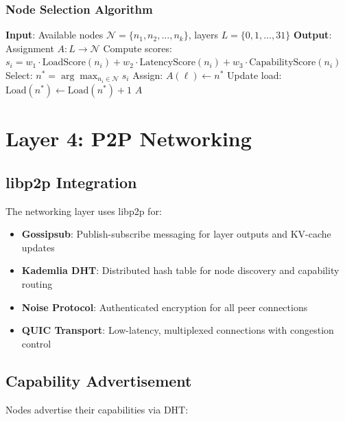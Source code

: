 \documentclass[11pt,a4paper]{article}
\begin{document}
\subsubsection{Node Selection Algorithm}

\begin{algorithm}[H]
\caption{Dynamic Layer Assignment with Load Balancing}
\begin{algorithmic}[1]
\STATE \textbf{Input}: Available nodes $\mathcal{N} = \{n_1, n_2, \ldots, n_k\}$, layers $L = \{0, 1, \ldots, 31\}$
\STATE \textbf{Output}: Assignment $A: L \rightarrow \mathcal{N}$
    \STATE Compute scores: $s_i = w_1 \cdot \text{LoadScore}(n_i) + w_2 \cdot \text{LatencyScore}(n_i) + w_3 \cdot \text{CapabilityScore}(n_i)$
    \STATE Select: $n^* = \arg\max_{n_i \in \mathcal{N}} s_i$
    \STATE Assign: $A(\ell) \gets n^*$
    \STATE Update load: $\text{Load}(n^*) \gets \text{Load}(n^*) + 1$
\ENDFOR
\RETURN $A$
\end{algorithmic}
\end{algorithm}

\newpage
\section{Layer 4: P2P Networking}

\subsection{libp2p Integration}

The networking layer uses libp2p for:
\begin{itemize}
    \item \textbf{Gossipsub}: Publish-subscribe messaging for layer outputs and KV-cache updates
    \item \textbf{Kademlia DHT}: Distributed hash table for node discovery and capability routing
    \item \textbf{Noise Protocol}: Authenticated encryption for all peer connections
    \item \textbf{QUIC Transport}: Low-latency, multiplexed connections with congestion control
\end{itemize}

\subsection{Capability Advertisement}

Nodes advertise their capabilities via DHT:
\end{document}
